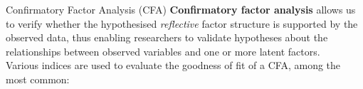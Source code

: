 \documentclass{beamer}
\begin{document}
\begin{frame}{Confirmatory Factor Analysis (CFA)}
    \textbf{Confirmatory factor analysis} allows us to verify whether the hypothesised \textit{reflective} factor structure is supported by the observed data, thus enabling researchers to validate hypotheses about the relationships between observed variables and one or more latent factors.\\
    \pause
    \vspace{1em}
    Various indices are used to evaluate the goodness of fit of a CFA, among the most common: \\
    \vspace{0.5em}
\end{frame}
\end{document}
